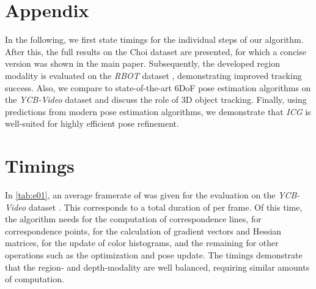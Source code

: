 \documentclass[10pt,twocolumn,letterpaper]{article}
\begin{document}
 

{\small


}


\vfill
\pagebreak
\appendix
\section*{Appendix}
In the following, we first state timings for the individual steps of our algorithm.
After this, the full results on the Choi dataset \cite{Choi2013} are presented, for which a concise version was shown in the main paper.
Subsequently, the developed region modality is evaluated on the \textit{RBOT} dataset \cite{Tjaden2018}, demonstrating improved tracking success.
Also, we compare to state-of-the-art \acs{6DoF} pose estimation algorithms on the \textit{YCB-Video} dataset \cite{Xiang2018} and discuss the role of 3D object tracking.
Finally, using predictions from modern pose estimation algorithms, we demonstrate that \textit{ICG} is well-suited for highly efficient pose refinement.



\section{Timings}\label{sec:a0}
In \cref{tab:e01}, an average framerate of  was given for the evaluation on the \textit{YCB-Video} dataset \cite{Xiang2018}.
This corresponds to a total duration of  per frame.
Of this time, the algorithm needs  for the computation of correspondence lines,  for correspondence points,  for the calculation of gradient vectors and Hessian matrices,  for the update of color histograms, and the remaining  for other operations such as the optimization and pose update.
The timings demonstrate that the region- and depth-modality are well balanced, requiring similar amounts of computation.
\end{document}

